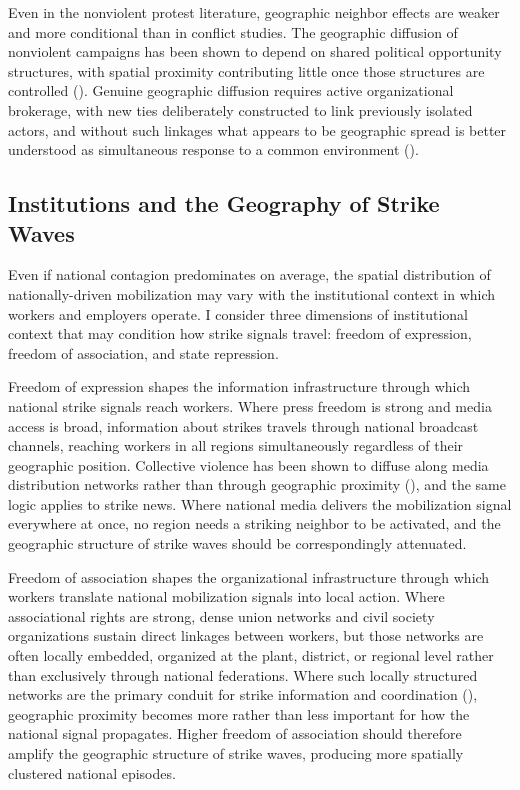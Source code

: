\documentclass[
  11pt,
]{article}
\begin{document}
Even in the nonviolent protest literature, geographic neighbor effects
are weaker and more conditional than in conflict studies. The geographic
diffusion of nonviolent campaigns has been shown to depend on shared
political opportunity structures, with spatial proximity contributing
little once those structures are controlled
().
Genuine geographic diffusion requires active organizational brokerage,
with new ties deliberately constructed to link previously isolated
actors, and without such linkages what appears to be geographic spread
is better understood as simultaneous response to a common environment
().

\subsection{Institutions and the Geography of Strike
Waves}\label{institutions-and-the-geography-of-strike-waves}

Even if national contagion predominates on average, the spatial
distribution of nationally-driven mobilization may vary with the
institutional context in which workers and employers operate. I consider
three dimensions of institutional context that may condition how strike
signals travel: freedom of expression, freedom of association, and state
repression.

Freedom of expression shapes the information infrastructure through
which national strike signals reach workers. Where press freedom is
strong and media access is broad, information about strikes travels
through national broadcast channels, reaching workers in all regions
simultaneously regardless of their geographic position. Collective
violence has been shown to diffuse along media distribution networks
rather than through geographic proximity (), and the same logic applies to strike news. Where national media
delivers the mobilization signal everywhere at once, no region needs a
striking neighbor to be activated, and the geographic structure of
strike waves should be correspondingly attenuated.

Freedom of association shapes the organizational infrastructure through
which workers translate national mobilization signals into local action.
Where associational rights are strong, dense union networks and civil
society organizations sustain direct linkages between workers, but those
networks are often locally embedded, organized at the plant, district,
or regional level rather than exclusively through national federations.
Where such locally structured networks are the primary conduit for
strike information and coordination (), geographic proximity becomes more rather than less important for
how the national signal propagates. Higher freedom of association should
therefore amplify the geographic structure of strike waves, producing
more spatially clustered national episodes.
\end{document}
